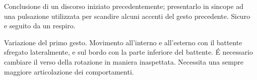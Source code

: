 \documentclass{book}
\begin{document}
\begin{minipage}{0.2\textwidth}
\end{minipage}%
\begin{minipage}{0.6\textwidth}
\justify Conclusione di un discorso iniziato precedentemente; presentarlo in sincope ad una pulsazione utilizzata per scandire alcuni accenti del gesto precedente. Sicuro e seguito da un respiro.
\end{minipage}


\begin{minipage}{0.2\textwidth}
\end{minipage}%
\begin{minipage}{0.6\textwidth}
\justify Variazione del primo gesto. Movimento all'interno e all'esterno con il battente sfregato lateralmente, e sul bordo con la parte inferiore del battente. \' E necessario cambiare il verso della rotazione in maniera inaspettata. Necessita una sempre maggiore articolazione dei comportamenti. 
\end{minipage}
\end{document}
